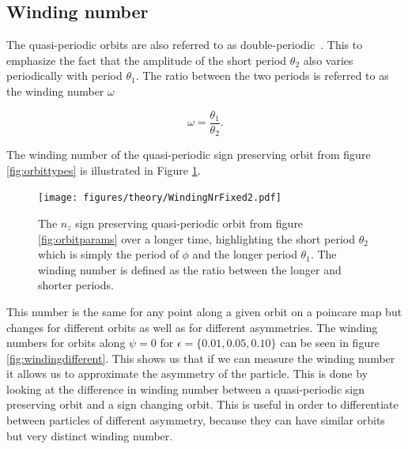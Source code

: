 \subsection{Winding number} \label{sec:winding}
The quasi-periodic orbits are also referred to as double-periodic~\cite{Yarin}. This to emphasize the fact that the amplitude of the short period $\theta_2$ also varies periodically with period $\theta_1$. The ratio between the two periods is referred to as the winding number $\omega$

\begin{equation}\label{eq:winding}
\omega = \frac{\theta_1}{\theta_2}.
\end{equation}

\noindent The winding number of the quasi-periodic sign preserving orbit from figure \ref{fig:orbittypes} is illustrated in Figure \ref{fig:windingDef}.

\begin{figure}[H]
\begin{center}
\texttt{[image: figures/theory/WindingNrFixed2.pdf]}
\end{center}
\caption{The $n_z$ sign preserving quasi-periodic orbit from figure \ref{fig:orbitparams} over a longer time, highlighting the short period $\theta_2$ which is simply the period of $\phi$ and the longer period $\theta_1$. The winding number is defined as the ratio between the longer and shorter periods.}
\label{fig:windingDef}
\end{figure}

This number is the same for any point along a given orbit on a poincare map but changes for different orbits as well as for different asymmetries. The winding numbers for orbits along $\psi=0$ for $\epsilon=\{0.01, 0.05, 0.10\}$ can be seen in figure \ref{fig:windingdifferent}. This shows us that if we can measure the winding number it allows us to approximate the asymmetry of the particle.  This is done by looking at the difference in winding number between a quasi-periodic sign preserving orbit and a sign changing orbit. This is useful in order to differentiate between particles of different asymmetry, because they can have similar orbits but very distinct winding number. 
 
